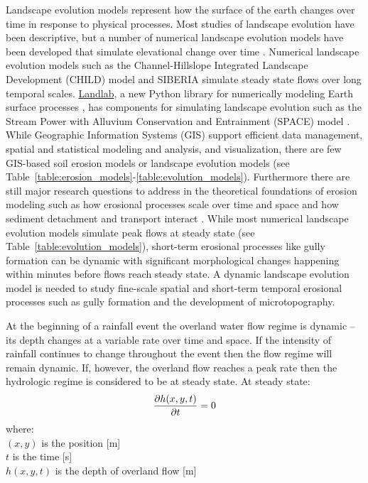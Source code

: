 \documentclass[gmd, manuscript]{copernicus}
\begin{document}
\introduction
Landscape evolution models represent how the surface of the earth changes 
over time in response to physical processes. 
Most studies of landscape evolution have been descriptive, 
but a number of numerical landscape evolution models 
have been developed that simulate elevational change over time 
\citep{Temme2013}. 
Numerical landscape evolution models
such as the Channel-Hillslope Integrated Landscape Development (CHILD) model 
\citep{Tucker2001} 
and SIBERIA \citep{Willgoose2005}
simulate steady state flows over long temporal scales. 
\href{http://landlab.github.io/}{Landlab},
a new Python library for numerically modeling Earth surface processes
\citep{Hobley2017},
has components for simulating landscape evolution such as the 
Stream Power with Alluvium Conservation and Entrainment (SPACE) 
model \citep{Shobe2017}.
While Geographic Information Systems (GIS)
support efficient data management, 
spatial and statistical modeling and analysis, 
and visualization,
there are few GIS-based soil erosion models or landscape evolution models
(see Table~\ref{table:erosion_models}-\ref{table:evolution_models}).
Furthermore there are still major research questions 
to address in the theoretical foundations of erosion modeling 
such as how erosional processes scale over time and space 
and how sediment detachment and transport interact \citep{Mitasova2013}. 
While most numerical landscape evolution models 
simulate peak flows at steady state
(see Table~\ref{table:evolution_models}),
short-term erosional processes like gully formation can be dynamic
with significant morphological changes happening within minutes
before flows reach steady state. 
A dynamic landscape evolution model is needed to study
fine-scale spatial and short-term temporal erosional processes
such as gully formation and the development of microtopography. 


At the beginning of a rainfall event 
the overland water flow regime is dynamic -- 
its depth changes at a variable rate over time and space. 
If the intensity of rainfall continues to change throughout the event
then the flow regime will remain dynamic. 
If, however, the overland flow reaches a peak rate
then the hydrologic regime is considered to be at steady state.
At steady state:
\begin{equation}
\label{eq:steady_state}
{\partial h(x,y,t) \over \partial t} = 0 %
\end{equation}
%
{\small
\noindent
where: \\
\noindent
\hspace*{0.5em} $(x,y)$ is the position [\unit{m}]\\
\hspace*{0.5em} $t$ is the time [\unit{s}] \\
\hspace*{0.5em} $h(x,y,t)$ is the depth of overland flow [\unit{m}]\\
}
\end{document}
